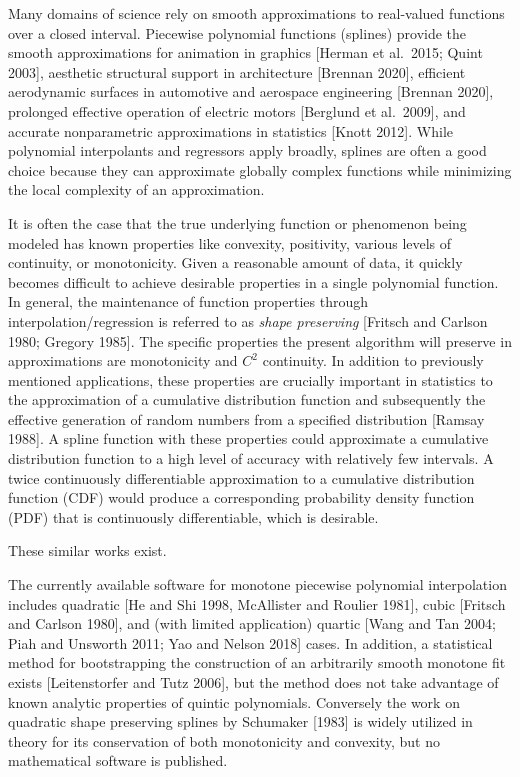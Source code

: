 
Many domains of science rely on smooth approximations to real-valued
functions over a closed interval. Piecewise polynomial functions
(splines) provide the smooth approximations for animation in graphics
[Herman et al.\ 2015; Quint 2003], aesthetic structural support in
architecture [Brennan 2020], efficient aerodynamic surfaces in
automotive and aerospace engineering [Brennan 2020], prolonged
effective operation of electric motors [Berglund et al.\ 2009], and
accurate nonparametric approximations in statistics [Knott
2012]. While polynomial interpolants and regressors apply broadly,
splines are often a good choice because they can approximate globally
complex functions while minimizing the local complexity of an
approximation.

It is often the case that the true underlying function or phenomenon
being modeled has known properties like convexity, positivity,
various levels of continuity, or monotonicity. Given a reasonable
amount of data, it quickly becomes difficult to achieve desirable
properties in a single polynomial function. In general, the
maintenance of function properties through interpolation/regression is
referred to as {\it shape preserving} [Fritsch and Carlson 1980;
Gregory 1985]. The specific properties the present algorithm will
preserve in approximations are monotonicity and $C^2$ continuity. In
addition to previously mentioned applications, these properties are
crucially important in statistics to the approximation of a cumulative
distribution function and subsequently the effective generation of
random numbers from a specified distribution [Ramsay 1988].  A spline
function with these properties could approximate a cumulative
distribution function to a high level of accuracy with relatively few
intervals. A twice continuously differentiable approximation to a
cumulative distribution function (CDF) would produce a corresponding
probability density function (PDF) that is continuously
differentiable, which is desirable.


These similar works exist.


The currently available software for monotone piecewise polynomial
interpolation includes quadratic [He and Shi 1998, McAllister and
Roulier 1981], cubic [Fritsch and Carlson 1980], and (with limited
application) quartic [Wang and Tan 2004; Piah and Unsworth 2011; Yao
and Nelson 2018] cases. In addition, a statistical method for
bootstrapping the construction of an arbitrarily smooth monotone fit
exists [Leitenstorfer and Tutz 2006], but the method does not take
advantage of known analytic properties of quintic polynomials.
Conversely the work on quadratic shape preserving splines by Schumaker
[1983] is widely utilized in theory for its conservation of both
monotonicity and convexity, but no mathematical software is published.

